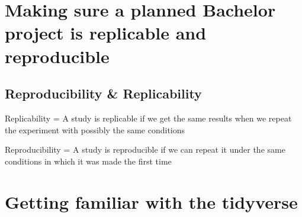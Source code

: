 \documentclass[11pt]{article}
\begin{document}
\section{Making sure a planned Bachelor project is replicable and reproducible}
\label{sec:org4d9fc5f}
\subsection{Reproducibility \& Replicability}
\label{sec:orgbc966ab}
Replicability = A study is replicable if we get the same results
when we repeat the experiment with possibly the same conditions

Reproducibility =  A study is reproducible if we can repeat it under the same conditions
in which it was made the first time

\section{Getting familiar with the tidyverse}
\label{sec:org5158441}
\end{document}
